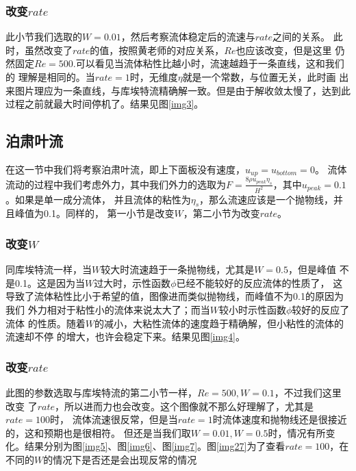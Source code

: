 \documentclass[11pt,UTF8]{ctexart}
\begin{document}
    \subsubsection{改变$rate$}
    \par{此小节我们选取的$W=0.01$，然后考察流体稳定后的流速与$rate$之间的关系。
    此时，虽然改变了$rate$的值，按照黄老师的对应关系，$Re$也应该改变，但是这里
    仍然固定$Re=500$.可以看见当流体粘性比越小时，流速越趋于一条直线，这和我们的
    理解是相同的。当$rate=1$时，无维度$\eta$就是一个常数，与位置无关，此时画
    出来图片理应为一条直线，与库埃特流精确解一致。但是由于解收敛太慢了，达到此
    过程之前就最大时间停机了。结果见图\ref {img3}。}
    \subsection{泊肃叶流}
    \par{在这一节中我们将考察泊肃叶流，即上下面板没有速度，$u_{up}=u_{bottom}=0$。
    流体流动的过程中我们考虑外力，其中我们外力的选取为$F=\frac{8\rho u_{peak} \eta_s}{H^2}$，其中$u_{peak}=0.1$。如果是单一成分流体，
    并且流体的粘性为$\eta_s$，那么流速应该是一个抛物线，并且峰值为0.1。同样的，
    第一小节是改变$W$，第二小节为改变$rate$。}
    \subsubsection{改变$W$}
    \par{同库埃特流一样，当$W$较大时流速趋于一条抛物线，尤其是$W=0.5$，但是峰值
    不是0.1。这是因为当$W$过大时，示性函数$\phi$已经不能较好的反应流体的性质了，
    这导致了流体粘性比小于希望的值，图像进而类似抛物线，而峰值不为0.1的原因为我们
    外力相对于粘性小的流体来说太大了；而当$W$较小时示性函数$\phi$较好的反应了流体
    的性质。随着$W$的减小，大粘性流体的速度趋于精确解，但小粘性的流体的流速却不停
    的增大，也许会稳定下来。结果见图\ref {img4}。}
    \subsubsection{改变$rate$}
    \par{此图的参数选取与库埃特流的第二小节一样，$Re=500,W=0.1$，不过我们这里改变
    了$rate$，所以进而力也会改变。这个图像就不那么好理解了，尤其是$rate=100$时，
    流体流速很反常，但是当$rate=1$时流体速度和抛物线还是很接近的，这和预期也是很相符。
    但还是当我们取$W=0.01,W=0.5$时，情况有所变化。结果分别为图\ref {img5}、图\ref {img6}、图\ref {img7}。图\ref {img27}为了查看$rate=100$，在不同的$W$的情况下是否还是会出现反常的情况}
\end{document}
